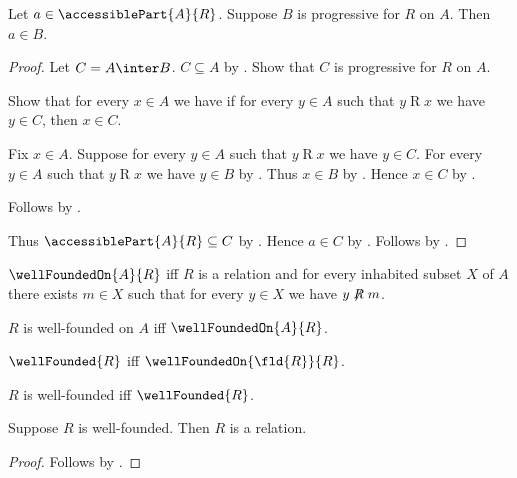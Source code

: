 \begin{proposition}\label{accessible_induction_set}
    Let $a\in\accessiblePart{A}{R}$.
    Suppose $B$ is progressive for $R$ on $A$.
    Then $a\in B$.
\end{proposition}
\begin{proof}
    Let $C=A\inter B$.
    $C\subseteq A$ by .
    Show that $C$ is progressive for $R$ on $A$.
    \begin{subproof}
        Show that for every $x\in A$ we have
            if for every $y\in A$ such that $y\mathrel{R}x$ we have $y\in C$,
            then $x\in C$.
        \begin{subproof}
            Fix $x\in A$.
            Suppose for every $y\in A$ such that $y\mathrel{R}x$ we have $y\in C$.
            For every $y\in A$ such that $y\mathrel{R}x$ we have $y\in B$
                by .
            Thus $x\in B$ by .
            Hence $x\in C$ by .
        \end{subproof}
        Follows by .
    \end{subproof}
    Thus $\accessiblePart{A}{R}\subseteq C$
        by .
    Hence $a\in C$ by .
    Follows by .
\end{proof}

\begin{definition}\label{well_founded_on}
    $\wellFoundedOn{A}{R}$ iff $R$ is a relation and
        for every inhabited subset $X$ of $A$
            there exists $m\in X$ such that for every $y\in X$
                we have $y\not\mathrel{R}m$.
\end{definition}

\begin{abbreviation}\label{well_founded_on_phrase}
    $R$ is well-founded on $A$ iff $\wellFoundedOn{A}{R}$.
\end{abbreviation}

\begin{definition}\label{well_founded}
    $\wellFounded{R}$ iff $\wellFoundedOn{\fld{R}}{R}$.
\end{definition}

\begin{abbreviation}\label{well_founded_phrase}
    $R$ is well-founded iff $\wellFounded{R}$.
\end{abbreviation}

\begin{classification}\label{well_founded_is_relation}
    Suppose $R$ is well-founded.
    Then $R$ is a relation.
\end{classification}
\begin{proof}
    Follows by .
\end{proof}

